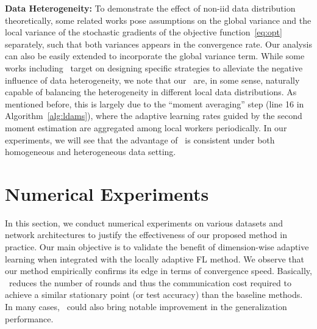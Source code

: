 \documentclass[manuscript,screen,review]{acmart}
\begin{document}
\vspace{0.1in}
\noindent\textbf{Data Heterogeneity:} To demonstrate the effect of non-iid data distribution theoretically, some related works pose assumptions on the global variance and the local variance of the stochastic gradients of the objective function~\eqref{eq:opt} separately, such that both variances appears in the convergence rate. Our analysis can also be easily extended to incorporate the global variance term. While some works including~\citet{karimireddy2019scaffold} target on designing specific strategies to alleviate the negative influence of data heterogeneity, we note that our \algo\ are, in some sense, naturally capable of balancing the heterogeneity in different local data distributions. As mentioned before, this is largely due to the ``moment averaging'' step (line 16 in Algorithm~\ref{alg:ldams}), where the adaptive learning rates guided by the second moment estimation are aggregated among local workers periodically. In our experiments, we will see that the advantage of \algo\ is consistent under both homogeneous and heterogeneous data setting. 





\section{Numerical Experiments}\label{sec:numerical}

In this section, we conduct numerical experiments on various datasets and network architectures to justify the effectiveness of our proposed method in practice. Our main objective is to validate the benefit of dimension-wise adaptive learning when integrated with the locally adaptive FL method.
We observe that our method empirically confirms its edge in terms of convergence speed.
Basically, \algo\ reduces the number of rounds and thus the communication cost required to achieve a similar stationary point (or test accuracy) than the baseline methods. In many cases, \algo\ could also bring notable improvement in the generalization performance.
\end{document}
